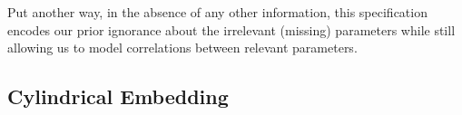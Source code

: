 \documentclass{article}
\newcommand{\vect}[1]{\underline{\smash{#1}}}
\renewcommand{\v}[1]{\vect{#1}}
\begin{document}
Put another way, in the absence of any other information, this specification encodes our prior ignorance about the irrelevant (missing) parameters while still allowing us to model correlations between relevant parameters.
%


\subsection{Cylindrical Embedding}
\vspace{-0.05in} 
\end{document}

